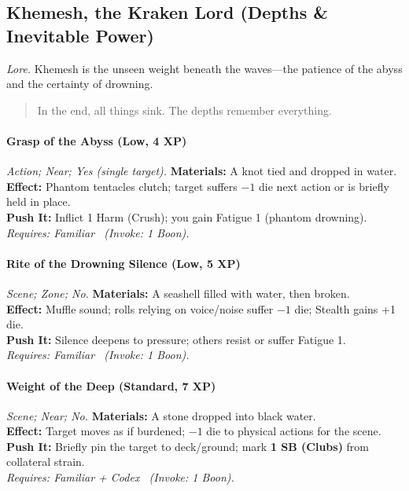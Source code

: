 \subsection{Khemesh, the Kraken Lord (Depths \& Inevitable Power)}
\textit{Lore.} Khemesh is the unseen weight beneath the waves—the patience of the abyss and the certainty of drowning.

\begin{quote}
In the end, all things sink. The depths remember everything.
\end{quote}

\paragraph{Grasp of the Abyss (Low, 4 XP)} \emph{Action; Near; Yes (single target).}
\textbf{Materials:} A knot tied and dropped in water.\\
\textbf{Effect:} Phantom tentacles clutch; target suffers \(-1\) die next action or is briefly held in place.\\
\textbf{Push It:} Inflict 1 Harm (Crush); you gain Fatigue 1 (phantom drowning).\\
\emph{Requires: Familiar \ (\textit{Invoke:} 1 Boon).}

\paragraph{Rite of the Drowning Silence (Low, 5 XP)} \emph{Scene; Zone; No.}
\textbf{Materials:} A seashell filled with water, then broken.\\
\textbf{Effect:} Muffle sound; rolls relying on voice/noise suffer \(-1\) die; Stealth gains +1 die.\\
\textbf{Push It:} Silence deepens to pressure; others resist or suffer Fatigue 1.\\
\emph{Requires: Familiar \ (\textit{Invoke:} 1 Boon).}

\paragraph{Weight of the Deep (Standard, 7 XP)} \emph{Scene; Near; No.}
\textbf{Materials:} A stone dropped into black water.\\
\textbf{Effect:} Target moves as if burdened; \(-1\) die to physical actions for the scene.\\
\textbf{Push It:} Briefly pin the target to deck/ground; mark \textbf{1 SB (Clubs)} from collateral strain.\\
\emph{Requires: Familiar + Codex \ (\textit{Invoke:} 1 Boon).}

